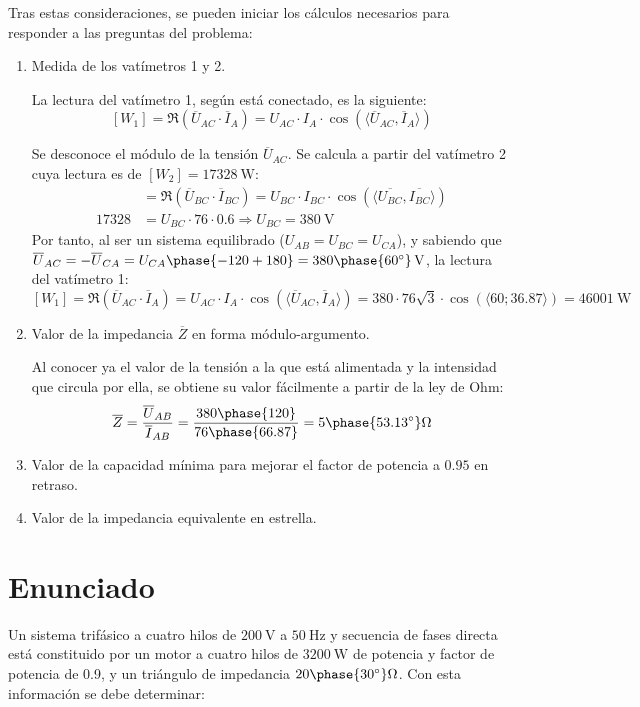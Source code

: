 Tras estas consideraciones, se pueden iniciar los cálculos necesarios
para responder a las preguntas del problema:
\begin{enumerate}
\item Medida de los vatímetros 1 y 2.
    
  La lectura del vatímetro 1, según está conectado, es la siguiente:
  \[ [W_1]=\Re(\overline{U}_{AC}\cdot \overline{I} _A)=U_{AC}\cdot I_A\cdot
    \cos(\langle \overline{U}_{AC}, \overline{I}_A \rangle)
  \]

  Se desconoce el módulo de la tensión $\overline{U}_{AC}$. Se calcula
  a partir del vatímetro 2 cuya lectura es de
  $[W_2]=\qty{17328}{\watt}$:
  \begin{align*}
 [W_2] &=\Re(\overline{U}_{BC} \cdot \overline{I}_{BC})=U_{BC}\cdot
    I_{BC}\cdot \cos(\langle \overline{U_{BC}},
         \overline{I_{BC}}\rangle)\\
    17328&=U_{BC}\cdot 76\cdot
    0.6\Rightarrow U_{BC}=\qty{380}{\volt}
  \end{align*}
  Por tanto, al ser un sistema equilibrado ($U_{AB}=U_{BC}=U_{CA}$), y
  sabiendo que
  $\overline{U}_{AC}=-\overline{U}_{CA}=U_{CA}\phase{-120+180}=\qty[parse-numbers=false]{380\phase{\ang{60}}}{\volt}$,
  la lectura del vatímetro 1:
  \[ [W_1]=\Re(\overline{U}_{AC}\cdot \overline{I}_A)=U_{AC}\cdot I_A\cdot
    \cos(\langle \overline{U}_{AC}, \overline{I}_A \rangle)=380\cdot
    76\sqrt{3}\cdot \cos(\langle60;36.87\rangle)=\qty{46001}{\watt}
  \]

\item Valor de la impedancia $\overline{Z}$ en forma módulo-argumento.

  Al conocer ya el valor de la tensión a la que está alimentada y la
  intensidad que circula por ella, se obtiene su valor fácilmente a
  partir de la ley de Ohm:
  \[
    \overline{Z}=\dfrac{\overline{U}_{AB}}{\overline{I}_{AB}}=\dfrac{380\phase{120}}{76\phase{66.87}}={5\phase{\ang{53.13}}}\unit{\ohm}
  \]

\item Valor de la capacidad mínima para mejorar el factor de potencia
  a $0.95$ en retraso.




\item Valor de la impedancia equivalente en estrella.


\end{enumerate}

\section{Enunciado}
Un sistema trifásico a cuatro hilos de $\qty{200}{\volt}$ a $\qty{50}{\hertz}$ y secuencia de fases directa está constituido por un motor a cuatro hilos de $\qty{3200}{\watt}$ de potencia y factor de potencia de 0.9, y un triángulo de impedancia $20\phase{\ang{30}}\unit{\ohm}$. Con esta información se debe determinar:

